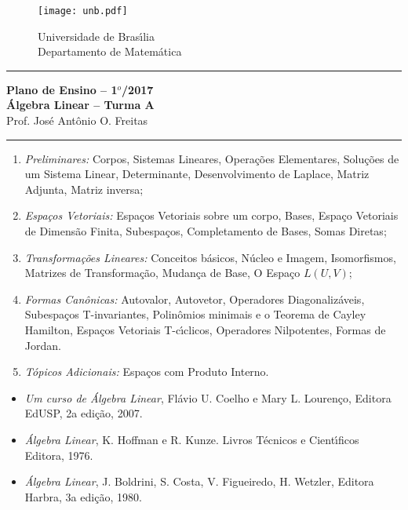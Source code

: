 \documentclass[12pt]{article}
\begin{document}
\pagestyle{empty}

\begin{figure}[h]
    \begin{minipage}[c]{1.7cm}
    \texttt{[image: unb.pdf]}
    \end{minipage}%
    \hspace{0pt}
    \begin{minipage}[c]{4in}
    {Universidade de Bras{{\'\i}}lia} \\
    {Departamento de Matem\'atica}
    \end{minipage}
\end{figure}
\vspace{-0.9cm}
\hrule

\begin{center}
{\large\bf Plano de Ensino -- 1$^{o}$/2017} \\
{\large\bf \'Algebra Linear -- Turma A}\\
Prof. Jos\'e Ant\^onio O. Freitas
\end{center}
\hrule
\vspace{0.25cm}
\begin{enumerate}[1)]
\item \textit{Preliminares:} Corpos, Sistemas Lineares, Opera\c{c}\~oes Elementares, Solu\c{c}\~oes de um Sistema Linear, Determinante, Desenvolvimento de Laplace, Matriz Adjunta, Matriz inversa;

\item \textit{Espa\c{c}os Vetoriais:} Espa\c{c}os Vetoriais sobre um corpo, Bases, Espa\c{c}o Vetoriais de Dimens\~ao Finita, Subespa\c{c}os, Completamento de Bases, Somas Diretas;


\item \textit{Transforma\c{c}\~oes Lineares:} Conceitos b\'asicos, N\'ucleo e Imagem, Isomorfismos, Matrizes de Transforma\c{c}\~ao, Mudan\c{c}a de Base, O Espa\c{c}o $L(U,V)$;

\item \textit{Formas Can\^onicas:} Autovalor, Autovetor, Operadores Diagonaliz\'aveis, Subespa\c{c}os T-invariantes, Polin\^omios minimais e o Teorema de Cayley Hamilton, Espa\c{c}os Vetoriais T-c{\'\i}clicos, Operadores Nilpotentes, Formas de Jordan.

\item \textit{T\'opicos Adicionais:} Espa\c{c}os com Produto Interno.

\end{enumerate}

\begin{itemize}
 \item \textit{Um curso de \'Algebra Linear}, Fl\'avio U. Coelho e Mary L. Louren\c{c}o,  Editora EdUSP, 2a edi\c{c}\~ao, 2007. 

\item \textit{\'Algebra Linear}, K. Hoffman e R. Kunze. Livros T\'ecnicos e Cient{\'\i}ficos Editora, 1976.

\item \textit{\'Algebra Linear}, J. Boldrini, S. Costa, V. Figueiredo, H. Wetzler, Editora Harbra, 3a edi\c{c}\~ao, 1980.

\end{itemize}
\end{document}
